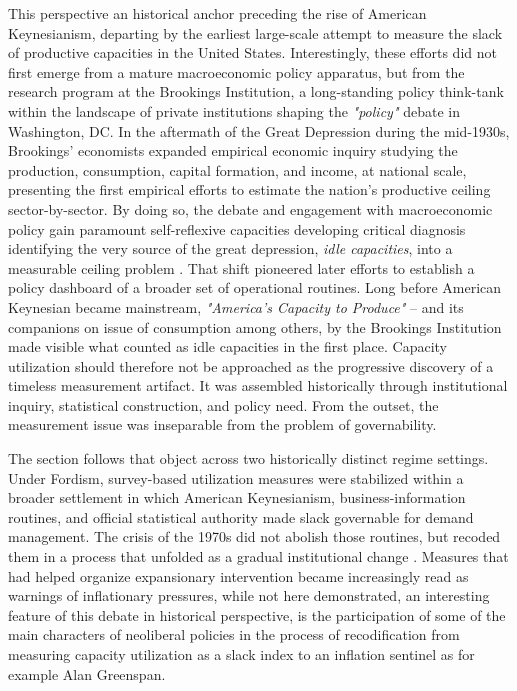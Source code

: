 \documentclass[11pt,a4paper]{article}
\begin{document}
This perspective an historical anchor preceding the rise of American Keynesianism, departing by the earliest large-scale attempt to measure the slack of productive capacities in the United States. Interestingly, these efforts did not first emerge from a mature macroeconomic policy apparatus, but from the research program at the Brookings Institution, a long-standing policy think-tank within the landscape of private institutions shaping the \textit{"policy"} debate in Washington, DC. In the aftermath of the Great Depression during the mid-1930s, Brookings' economists expanded empirical economic inquiry studying the production, consumption, capital formation, and income, at national scale, presenting the first empirical efforts to estimate the nation’s productive ceiling sector-by-sector. By doing so, the debate and engagement with macroeconomic policy gain paramount self-reflexive capacities developing critical diagnosis identifying the very source of the great depression,  \emph{idle capacities}, into a measurable ceiling problem \citep{Nourse1934}. That shift pioneered later efforts to establish a policy  dashboard of a broader set of operational routines. Long before American Keynesian became mainstream, \textit{"America’s Capacity to Produce"} -- and its companions on issue of consumption among others, by the Brookings
Institution made visible what counted as idle capacities in the first place. Capacity utilization should therefore not be approached as the progressive discovery of a timeless measurement artifact. It was assembled historically through institutional inquiry, statistical construction, and policy need. From the outset, the measurement issue was inseparable from the problem of governability.

The section follows that object across two historically distinct regime settings. Under Fordism, survey-based utilization measures were stabilized within a broader settlement in which American Keynesianism, business-information routines, and official statistical authority made slack governable for demand management. The crisis of the 1970s did not abolish those routines, but recoded them in a process that unfolded 
as a gradual institutional change \citep{MahoneyThelen2009}. Measures that had helped organize expansionary intervention became increasingly read as warnings of inflationary pressures, while not here demonstrated, an interesting feature of this debate in historical perspective, is the participation of some of the main characters of neoliberal policies in the process of recodification from measuring capacity utilization as a slack index to an inflation sentinel as for example Alan Greenspan.  
\end{document}
